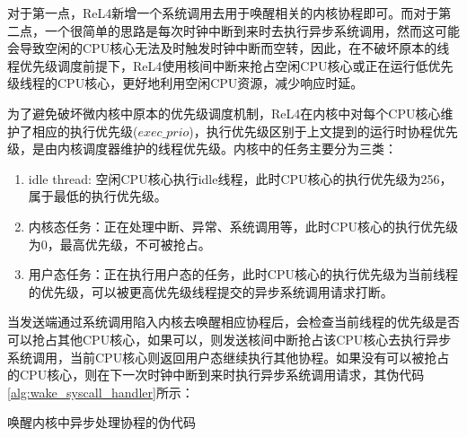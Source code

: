 对于第一点，ReL4新增一个系统调用去用于唤醒相关的内核协程即可。而对于第二点，一个很简单的思路是每次时钟中断到来时去执行异步系统调用，然而这可能会导致空闲的CPU核心无法及时触发时钟中断而空转，因此，在不破坏原本的线程优先级调度前提下，ReL4使用核间中断来抢占空闲CPU核心或正在运行低优先级线程的CPU核心，更好地利用空闲CPU资源，减少响应时延。

为了避免破坏微内核中原本的优先级调度机制，ReL4在内核中对每个CPU核心维护了相应的执行优先级($exec\_prio$)，执行优先级区别于上文提到的运行时协程优先级，是由内核调度器维护的线程优先级。内核中的任务主要分为三类：
\begin{enumerate}
  \item idle thread: 空闲CPU核心执行idle线程，此时CPU核心的执行优先级为256，属于最低的执行优先级。
  \item 内核态任务：正在处理中断、异常、系统调用等，此时CPU核心的执行优先级为0，最高优先级，不可被抢占。
  \item 用户态任务：正在执行用户态的任务，此时CPU核心的执行优先级为当前线程的优先级，可以被更高优先级线程提交的异步系统调用请求打断。
\end{enumerate}


当发送端通过系统调用陷入内核去唤醒相应协程后，会检查当前线程的优先级是否可以抢占其他CPU核心，如果可以，则发送核间中断抢占该CPU核心去执行异步系统调用，当前CPU核心则返回用户态继续执行其他协程。如果没有可以被抢占的CPU核心，则在下一次时钟中断到来时执行异步系统调用请求，其伪代码\ref{alg:wake_syscall_handler}所示：


\begin{algorithm}[H]
    \caption{唤醒内核中异步处理协程的伪代码}\label{alg:wake_syscall_handler}
\end{algorithm}

